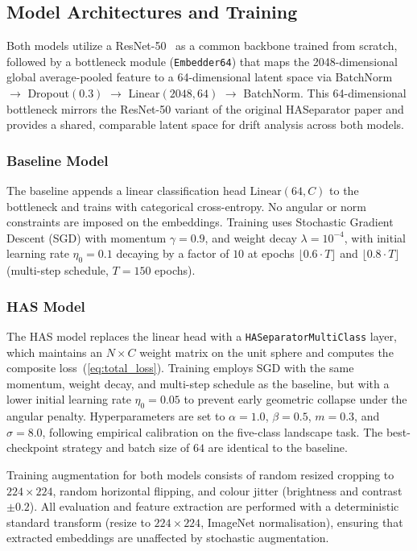 

\subsection{Model Architectures and Training}
\label{sec:training}

Both models utilize a ResNet-50~\cite{he-zhang-etal:2016} as a common backbone trained from scratch, followed by a bottleneck module (\texttt{Embedder64}) that maps the
2048-dimensional global average-pooled feature to a
64-dimensional latent space via BatchNorm $\to$ Dropout$(0.3)$
$\to$ Linear$(2048, 64)$ $\to$ BatchNorm.
This 64-dimensional bottleneck mirrors the ResNet-50 variant
of the original HASeparator paper \cite{kansizoglou-santavas-etal:2020}
and provides a shared, comparable latent space for drift analysis
across both models.

\subsubsection{Baseline Model}

The baseline appends a linear classification head
$\mathrm{Linear}(64, C)$ to the bottleneck and trains with
categorical cross-entropy.
No angular or norm constraints are imposed on the embeddings.
Training uses Stochastic Gradient Descent (SGD) with
momentum $\gamma = 0.9$, and
weight decay $\lambda = 10^{-4}$, with initial learning rate
$\eta_0 = 0.1$ decaying by a factor of $10$ at epochs
$\lfloor 0.6 \cdot T \rfloor$ and $\lfloor 0.8 \cdot T \rfloor$
(multi-step schedule, $T = 150$ epochs).

\subsubsection{HAS Model}

The HAS model replaces the linear head with a
\texttt{HASeparatorMultiClass} layer, which maintains an
$N \times C$ weight matrix on the unit sphere and computes the
composite loss~(\ref{eq:total_loss}).
Training employs SGD with the same momentum, weight decay, and
multi-step schedule as the baseline, but with a lower
initial learning rate $\eta_0 = 0.05$ to prevent early
geometric collapse under the angular penalty.
Hyperparameters are set to $\alpha = 1.0$, $\beta = 0.5$,
$m = 0.3$, and $\sigma = 8.0$, following empirical calibration
on the five-class landscape task.
The best-checkpoint strategy and batch size of $64$ are
identical to the baseline.

Training augmentation for both models consists of random
resized cropping to $224 \times 224$, random horizontal flipping,
and colour jitter (brightness and contrast $\pm 0.2$).
All evaluation and feature extraction are performed with a
deterministic standard transform (resize to $224\times224$,
ImageNet normalisation), ensuring that extracted embeddings are
unaffected by stochastic augmentation.




